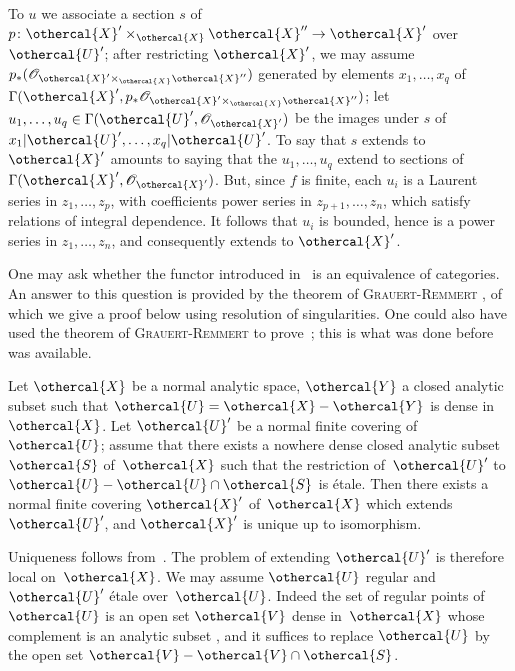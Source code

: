 To $u$ we associate a section $s$ of
$p\colon\othercal{X}'\times_{\othercal{X}}\othercal{X}''\to\othercal{X}'$ over
$\othercal{U}'$; after restricting $\othercal{X}'$, we may assume
$p_*(\cal{O}_{\othercal{X}'\times_{\othercal{X}}\othercal{X}''})$
generated by elements $x_{1},\dots,x_{q}$ of
$\Gamma(\othercal{X}',
p_*\cal{O}_{\othercal{X}'\times_{\othercal{X}}\othercal{X}''})$; let
$u_{1},\dots,u_{q}\in\Gamma(\othercal{U}',\cal{O}_{\othercal{X}'})$ be the images
under $s$ of~${x_{1}}|\othercal{U}',\dots,{x_{q}}|\othercal{U}'$. To say
that $s$ extends to $\othercal{X}'$ amounts to saying that the
$u_{1},\dots,u_{q}$ extend to sections of
$\Gamma(\othercal{X}',\cal{O}_{\othercal{X}'})$. But, since $f$ is finite,
each $u_{i}$ is a Laurent series in $z_{1},\dots,z_{p}$,
with coefficients power series in
$z_{p{+}1},\dots,z_{n}$, which satisfy relations of
integral dependence. It follows that $u_{i}$ is
bounded, hence is a power series in $z_{1},\dots,z_{n}$,
and consequently extends to $\othercal{X}'$.

One may ask whether the functor introduced in~ is
an equivalence of categories. An answer to
this question is provided by the theorem of \textsc{Grauert}-\textsc{Remmert} \cite{XII.6},
of which we give a proof below using
resolution of singularities. One could also have used the
theorem of \textsc{Grauert}-\textsc{Remmert} to prove~;
this is what was done before~\cite{XII.8} was available.

\begin{theorem}
\label{XII.5.4}
Let
$\othercal{X}$ be a normal analytic space, $\othercal{Y}$ a
closed analytic subset such that
$\othercal{U}=\othercal{X}-\othercal{Y}$ is dense in~$\othercal{X}$. Let
$\othercal{U}'$ be a normal finite covering of~$\othercal{U}$; assume
that there exists a nowhere dense closed analytic subset $\othercal{S}$
of~$\othercal{X}$ such that the restriction of~$\othercal{U}'$ to
$\othercal{U}-\othercal{U}\cap\othercal{S}$ is \'etale. Then there exists a
normal finite covering $\othercal{X}'$ of~$\othercal{X}$ which extends
$\othercal{U}'$, and $\othercal{X}'$ is unique up to isomorphism.
\end{theorem}

Uniqueness follows from~. The problem of
extending $\othercal{U}'$ is therefore local on~$\othercal{X}$. We may assume
$\othercal{U}$ regular and $\othercal{U}'$ \'etale over~$\othercal{U}$.
Indeed the set of regular points of~$\othercal{U}$ is an open set
$\othercal{V}$ dense in~$\othercal{X}$ whose complement is an
analytic subset \hbox{\cite[~D th]{XII.4}}, and it suffices to replace
$\othercal{U}$ by the open set $\othercal{V}-\othercal{V}\cap\othercal{S}$.

